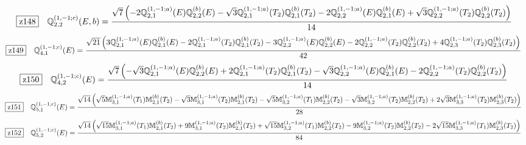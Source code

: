 \documentclass[fleqn,10pt,landscape]{jsarticle}
\begin{document}
\begin{dmath*}
\hspace*{3mm}\fbox{z148}\quad \mathbb{Q}_{2,2}^{(1,-1;c)}(E,b)=\frac{\sqrt{7} \left(- 2 \mathbb{Q}_{2,1}^{(1,-1;a)}(E) \mathbb{Q}_{2,2}^{(b)}(E) - \sqrt{3} \mathbb{Q}_{2,1}^{(1,-1;a)}(T_{2}) \mathbb{Q}_{2,1}^{(b)}(T_{2}) - 2 \mathbb{Q}_{2,2}^{(1,-1;a)}(E) \mathbb{Q}_{2,1}^{(b)}(E) + \sqrt{3} \mathbb{Q}_{2,2}^{(1,-1;a)}(T_{2}) \mathbb{Q}_{2,2}^{(b)}(T_{2})\right)}{14}
\end{dmath*}
\begin{dmath*}
\hspace*{3mm}\fbox{z149}\quad \mathbb{Q}_{4,1}^{(1,-1;c)}(E)=\frac{\sqrt{21} \left(3 \mathbb{Q}_{2,1}^{(1,-1;a)}(E) \mathbb{Q}_{2,1}^{(b)}(E) - 2 \mathbb{Q}_{2,1}^{(1,-1;a)}(T_{2}) \mathbb{Q}_{2,1}^{(b)}(T_{2}) - 3 \mathbb{Q}_{2,2}^{(1,-1;a)}(E) \mathbb{Q}_{2,2}^{(b)}(E) - 2 \mathbb{Q}_{2,2}^{(1,-1;a)}(T_{2}) \mathbb{Q}_{2,2}^{(b)}(T_{2}) + 4 \mathbb{Q}_{2,3}^{(1,-1;a)}(T_{2}) \mathbb{Q}_{2,3}^{(b)}(T_{2})\right)}{42}
\end{dmath*}
\begin{dmath*}
\hspace*{3mm}\fbox{z150}\quad \mathbb{Q}_{4,2}^{(1,-1;c)}(E)=\frac{\sqrt{7} \left(- \sqrt{3} \mathbb{Q}_{2,1}^{(1,-1;a)}(E) \mathbb{Q}_{2,2}^{(b)}(E) + 2 \mathbb{Q}_{2,1}^{(1,-1;a)}(T_{2}) \mathbb{Q}_{2,1}^{(b)}(T_{2}) - \sqrt{3} \mathbb{Q}_{2,2}^{(1,-1;a)}(E) \mathbb{Q}_{2,1}^{(b)}(E) - 2 \mathbb{Q}_{2,2}^{(1,-1;a)}(T_{2}) \mathbb{Q}_{2,2}^{(b)}(T_{2})\right)}{14}
\end{dmath*}
\begin{dmath*}
\hspace*{3mm}\fbox{z151}\quad \mathbb{Q}_{5,1}^{(1,-1;c)}(E)=\frac{\sqrt{14} \left(\sqrt{5} \mathbb{M}_{3,1}^{(1,-1;a)}(T_{1}) \mathbb{M}_{2,1}^{(b)}(T_{2}) - \sqrt{3} \mathbb{M}_{3,1}^{(1,-1;a)}(T_{2}) \mathbb{M}_{2,1}^{(b)}(T_{2}) - \sqrt{5} \mathbb{M}_{3,2}^{(1,-1;a)}(T_{1}) \mathbb{M}_{2,2}^{(b)}(T_{2}) - \sqrt{3} \mathbb{M}_{3,2}^{(1,-1;a)}(T_{2}) \mathbb{M}_{2,2}^{(b)}(T_{2}) + 2 \sqrt{3} \mathbb{M}_{3,3}^{(1,-1;a)}(T_{2}) \mathbb{M}_{2,3}^{(b)}(T_{2})\right)}{28}
\end{dmath*}
\begin{dmath*}
\hspace*{3mm}\fbox{z152}\quad \mathbb{Q}_{5,2}^{(1,-1;c)}(E)=\frac{\sqrt{14} \left(\sqrt{15} \mathbb{M}_{3,1}^{(1,-1;a)}(T_{1}) \mathbb{M}_{2,1}^{(b)}(T_{2}) + 9 \mathbb{M}_{3,1}^{(1,-1;a)}(T_{2}) \mathbb{M}_{2,1}^{(b)}(T_{2}) + \sqrt{15} \mathbb{M}_{3,2}^{(1,-1;a)}(T_{1}) \mathbb{M}_{2,2}^{(b)}(T_{2}) - 9 \mathbb{M}_{3,2}^{(1,-1;a)}(T_{2}) \mathbb{M}_{2,2}^{(b)}(T_{2}) - 2 \sqrt{15} \mathbb{M}_{3,3}^{(1,-1;a)}(T_{1}) \mathbb{M}_{2,3}^{(b)}(T_{2})\right)}{84}
\end{dmath*}
\end{document}
